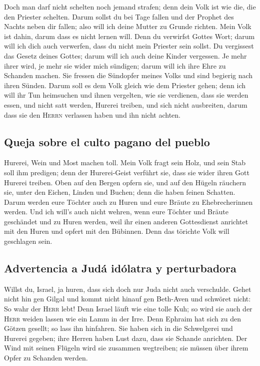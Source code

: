  Doch man darf nicht schelten noch jemand strafen; denn
dein Volk ist wie die, die den Priester schelten.  Darum
sollst du bei Tage fallen und der Prophet des Nachts neben dir fallen;
also will ich deine Mutter zu Grunde richten.  Mein Volk
ist dahin, darum dass es nicht lernen will. Denn du verwirfst Gottes
Wort; darum will ich dich auch verwerfen, dass du nicht mein Priester
sein sollst. Du vergissest das Gesetz deines Gottes; darum will ich auch
deine Kinder vergessen.  Je mehr ihrer wird, je mehr sie
wider mich sündigen; darum will ich ihre Ehre zu Schanden machen.
 Sie fressen die Sündopfer meines Volks und sind begierig
nach ihren Sünden.  Darum soll es dem Volk gleich wie dem
Priester gehen; denn ich will ihr Tun heimsuchen und ihnen vergelten,
wie sie verdienen,  dass sie werden essen, und nicht satt
werden, Hurerei treiben, und sich nicht ausbreiten, darum dass sie den
\textsc{Herrn} verlassen haben und ihn nicht achten.

\hypertarget{queja-sobre-el-culto-pagano-del-pueblo}{%
\subsection{Queja sobre el culto pagano del
pueblo}\label{queja-sobre-el-culto-pagano-del-pueblo}}

 Hurerei, Wein und Most machen toll.  Mein
Volk fragt sein Holz, und sein Stab soll ihm predigen; denn der
Hurerei-Geist verführt sie, dass sie wider ihren Gott Hurerei treiben.
 Oben auf den Bergen opfern sie, und auf den Hügeln
räuchern sie, unter den Eichen, Linden und Buchen; denn die haben feinen
Schatten. Darum werden eure Töchter auch zu Huren und eure Bräute zu
Ehebrecherinnen werden.  Und ich will's auch nicht
wehren, wenn eure Töchter und Bräute geschändet und zu Huren werden,
weil ihr einen anderen Gottesdienst anrichtet mit den Huren und opfert
mit den Bübinnen. Denn das törichte Volk will geschlagen sein.

\hypertarget{advertencia-a-juduxe1-iduxf3latra-y-perturbadora}{%
\subsection{Advertencia a Judá idólatra y
perturbadora}\label{advertencia-a-juduxe1-iduxf3latra-y-perturbadora}}

 Willst du, Israel, ja huren, dass sich doch nur Juda
nicht auch verschulde. Gehet nicht hin gen Gilgal und kommt nicht hinauf
gen Beth-Aven und schwöret nicht: So wahr der \textsc{Herr} lebt!
 Denn Israel läuft wie eine tolle Kuh; so wird sie auch
der \textsc{Herr} weiden lassen wie ein Lamm in der Irre.
 Denn Ephraim hat sich zu den Götzen gesellt; so lass ihn
hinfahren.  Sie haben sich in die Schwelgerei und Hurerei
gegeben; ihre Herren haben Lust dazu, dass sie Schande anrichten.
 Der Wind mit seinen Flügeln wird sie zusammen
wegtreiben; sie müssen über ihrem Opfer zu Schanden werden.

